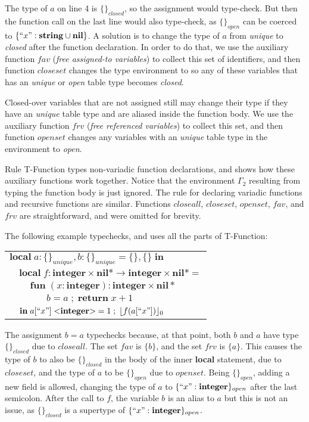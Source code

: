\documentclass[preprint]{sigplanconf}
\newcommand{\Nil}{\mathbf{nil}}
\newcommand{\Integer}{\mathbf{integer}}
\newcommand{\String}{\mathbf{string}}
\newcommand{\Void}{\Nil{*}}
\newcommand{\env}{\Gamma}
\begin{document}
The type of $a$ on line 4 is $\{\}_{closed}$, so the assignment
would type-check. But then the function call on the last line
would also type-check, as $\{\}_{open}$ can be coerced to
$\{ ``x": \String \cup \Nil\}$. A solution is to change the
type of $a$ from {\em unique} to {\em closed} after the function
declaration. In order to do that, we use the auxiliary function
$fav$ ({\em free assigned-to variables}) to collect this
set of identifiers, and then function $closeset$ changes
the type environment to so any of these variables that
has an {\em unique} or {\em open} table type becomes {\em closed}.

Closed-over variables that are not assigned still may
change their type if they have an {\em unique} table type
and are aliased inside the function body. We use the auxiliary
function $frv$ ({\em free referenced variables}) to collect
this set, and then function $openset$ changes any variables
with an {\em unique} table type in the environment to {\em open}.

Rule {\sc T-Function} types non-variadic function declarations,
and shows how these auxiliary functions work together.
Notice that the environment $\env_{2}$ resulting from
typing the function body is just ignored. The rule for
declaring variadic functions and recursive functions are
similar. Functions $closeall$, $closeset$, $openset$, $fav$,
and $frv$ are straightforward, and were omitted for brevity.

The following example typechecks, and uses all the parts of {\sc T-Function}:
\begin{center}
\begin{tabular}{llll}
\multicolumn{4}{l}{$\mathbf{local} \; a:\{\}_{unique}, b:\{\}_{unique} = \{\}, \{\} \; \mathbf{in}$}\\
& \multicolumn{3}{l}{$\mathbf{local} \; f:\Integer \times \Void \rightarrow \Integer \times \Void =$}\\
& & \multicolumn{2}{l}{$\mathbf{fun} \; (x:\Integer):\Integer \times \Void$}\\
& & & \multicolumn{1}{l}{$b = a \;;\; \mathbf{return} \; x + 1$}\\
& \multicolumn{3}{l}{$\mathbf{in} \; a[``x"] \; {<}\Integer{>} = 1 \;;\; \lfloor f(a[``x"]) \rfloor_0$}\\
\end{tabular}
\end{center}

The assignment $b=a$ typechecks because, at that point, 
both $b$ and $a$ have type $\{\}_{closed}$ due to $closeall$.
The set $fav$ is $\{b\}$, and the set $frv$ is $\{a\}$.
This causes the type of $b$ to also be $\{\}_{closed}$
in the body of the inner {\bf local} statement, due to $closeset$, and the type of $a$ to be $\{\}_{open}$ due
to $openset$. Being $\{\}_{open}$, adding a new field
is allowed, changing the type of $a$ to $\{``x": \Integer\}_{open}$ after the last semicolon. After the call to
$f$, the variable $b$ is an alias to $a$ but this is not
an issue, as $\{\}_{closed}$ is a supertype of $\{``x": \Integer\}_{open}$.
\end{document}

